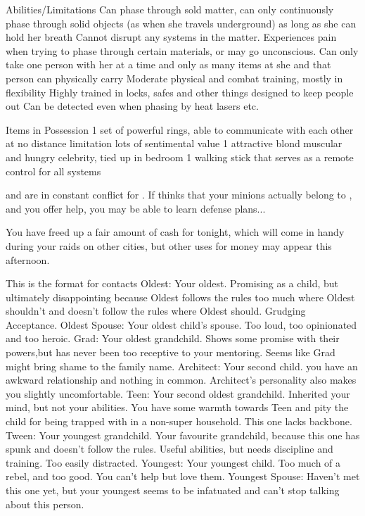 \documentclass[char]{LRSguildcamp1}
\begin{document}
\begin{itemz}[Notes]
	\item 
	
	Abilities/Limitations 
	Can phase through sold matter, can only continuously phase through solid objects (as when she travels underground) as long as she can hold her breath 
	Cannot disrupt any systems in the matter. 
	Experiences pain when trying to phase through certain materials, or may go unconscious. 
	Can only take one person with her at a time and only as many items at she and that person can physically carry 
	Moderate physical and combat training, mostly in flexibility 
	Highly trained in locks, safes and other things designed to keep people out 
	Can be detected even when phasing by heat lasers etc. 
	
	Items in Possession
	1 set of powerful rings, able to communicate with each other at no distance limitation lots of sentimental value 
	1 attractive blond muscular and hungry celebrity, tied up in bedroom 
	1 walking stick that serves as a remote control for all systems 
	\item \cOldest{} and \cOS{} are in constant conflict for \pCityO{}.  If \cOldest{} thinks that your minions actually belong to \cOS{}, and you offer help, you may be able to learn \cOldest{\their} defense plans...
	\item You have freed up a fair amount of cash for tonight, which will come in handy during your raids on other cities, but other uses for money may appear this afternoon.
\end{itemz}

\begin{contacts}
	\contact{} This is the format for contacts 
	Oldest: Your oldest. Promising as a child, but ultimately disappointing because Oldest follows the rules too much where Oldest shouldn’t and doesn’t follow the rules where Oldest should. Grudging Acceptance. 
	Oldest Spouse: Your oldest child’s spouse. Too loud, too opinionated and too heroic.
	Grad: Your oldest grandchild. Shows some promise with their powers,but has never been too receptive to your mentoring. Seems like Grad might bring shame to the family name.  
	Architect: Your second child. you have an awkward relationship and nothing in common. Architect’s personality also makes you slightly uncomfortable. 
	Teen: Your second oldest grandchild. Inherited your mind, but not your abilities. You have some warmth towards Teen and pity the child for being trapped with in a non-super household. This one lacks backbone. 
	Tween: Your youngest grandchild. Your favourite grandchild, because this one has spunk and doesn’t follow the rules. Useful abilities, but needs discipline and training. Too easily distracted. 
	Youngest: Your youngest child. Too much of a rebel, and too good. You can’t help but love them. 
	Youngest Spouse: Haven’t met this one yet, but your youngest seems to be infatuated and can’t stop talking about this person. 
	
\end{contacts}
\end{document}
